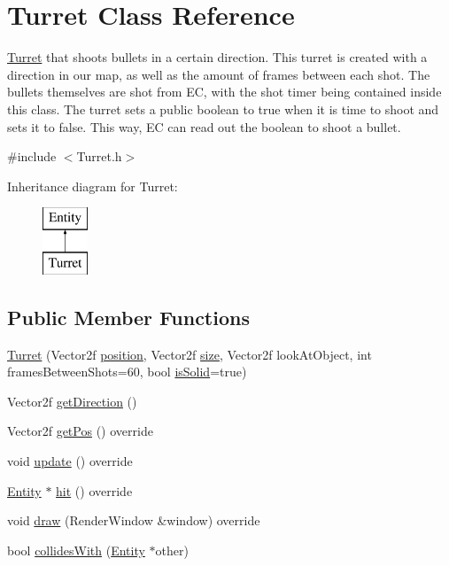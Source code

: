 \hypertarget{class_turret}{}\section{Turret Class Reference}
\label{class_turret}


\hyperlink{class_turret}{Turret} that shoots bullets in a certain direction. This turret is created with a direction in our map, as well as the amount of frames between each shot. The bullets themselves are shot from EC, with the shot timer being contained inside this class. The turret sets a public boolean to true when it is time to shoot and sets it to false. This way, EC can read out the boolean to shoot a bullet.  




{\ttfamily \#include $<$Turret.\+h$>$}

Inheritance diagram for Turret\+:\begin{figure}[H]
\begin{center}
\leavevmode
\includegraphics[height=2.000000cm]{class_turret}
\end{center}
\end{figure}
\subsection*{Public Member Functions}
\begin{DoxyCompactItemize}
\item 
\hyperlink{class_turret_a78913e2baf94c133ca9e1e18bcc24304}{Turret} (Vector2f \hyperlink{class_entity_a6af9d6498134ad0906011778bc5736db}{position}, Vector2f \hyperlink{class_entity_ae9a0a364c85f91ade5088b3610131417}{size}, Vector2f look\+At\+Object, int frames\+Between\+Shots=60, bool \hyperlink{class_entity_af1b0754c9d5f4afa73834b23c6437101}{is\+Solid}=true)
\item 
Vector2f \hyperlink{class_turret_aee3e22c1794e60cd8f89d1da39a6e443}{get\+Direction} ()
\item 
Vector2f \hyperlink{class_turret_a706e5a6001c3a0213b7510d4b99c0768}{get\+Pos} () override
\item 
void \hyperlink{class_turret_aad95afd1118f42d424465c14ebb445c7}{update} () override
\item 
\hyperlink{class_entity}{Entity} $\ast$ \hyperlink{class_turret_a141f76a3821b1d08a5aec057506c86e7}{hit} () override
\item 
void \hyperlink{class_turret_a7beef22798d993d9991bd22417034f49}{draw} (Render\+Window \&window) override
\item 
bool \hyperlink{class_turret_ada3f7ae7cdc24a5c24be131beb9887e8}{collides\+With} (\hyperlink{class_entity}{Entity} $\ast$other)
\end{DoxyCompactItemize}
